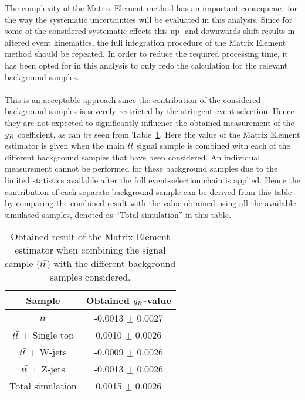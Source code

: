 The complexity of the Matrix Element method has an important consequence for the way the systematic uncertainties will be evaluated in this analysis.
Since for some of the considered systematic effects this up- and downwards shift results in altered event kinematics, the full integration procedure of the Matrix Element method should be repeated.
In order to reduce the required processing time, it has been opted for in this analysis to only redo the calculation for the relevant background samples.
\\
\\
This is an acceptable approach since the contribution of the considered background samples is severely restricted by the stringent event selection. Hence they are not expected to significantly influence the obtained measurement of the $g_{R}$ coefficient, as can be seen from Table~\ref{table::BckInfl}.
Here the value of the Matrix Element estimator is given when the main $t\bar{t}$ signal sample is combined with each of the different background samples that have been considered. An individual measurement cannot be performed for these background samples due to the limited statistics available after the full event-selection chain is applied.
Hence the contribution of each separate background sample can be derived from this table by comparing the combined result with the value obtained using all the available simulated samples, denoted as ``Total simulation'' in this table.
\\
\begin{table}[h!t]
 \centering
 \caption{Obtained result of the Matrix Element estimator when combining the signal sample ($t\bar{t}$) with the different background samples considered.} \label{table::BckInfl}
 \renewcommand{\arraystretch}{1.2}
 \begin{tabular}{|c|c|}
  \hline
  Sample 			& Obtained $\hat{g_{R}}$-value 	\\
  \hline
  $t\bar{t}$ 			&  -0.0013 $\pm$ 0.0027		\\
  $t\bar{t}$ + Single top 	&  0.0010 $\pm$ 0.0026		\\
  $t\bar{t}$ + W-jets  		&  -0.0009 $\pm$ 0.0026		\\
  $t\bar{t}$ + Z-jets 	 	&  -0.0013 $\pm$ 0.0026		\\
  \hline
  Total simulation 		& 0.0015 $\pm$ 0.0026 		\\
  \hline
 \end{tabular}
\end{table}

